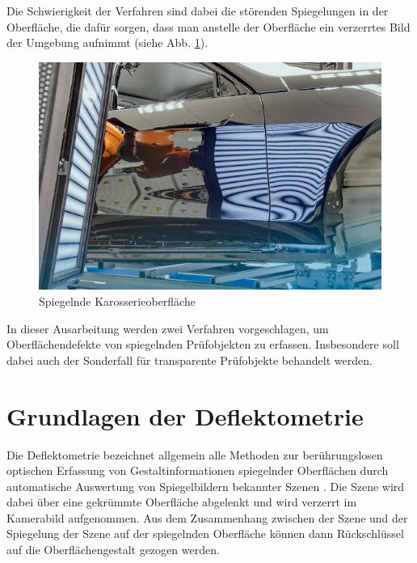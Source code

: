 \documentclass[ngerman,11pt,twocolumn,a4paper]{article}
\begin{document}
	\par
	Die Schwierigkeit der Verfahren sind dabei die störenden Spiegelungen in der Oberfläche, die dafür sorgen, dass man anstelle der Oberfläche ein verzerrtes Bild der Umgebung aufnimmt (siehe Abb. \ref{img:spiegelndeKarosserie}).
	\begin{figure}[H]
		\centering
		\includegraphics[width=0.75\columnwidth]{spiegelndeKarosserie}
		\caption{Spiegelnde Karosserieoberfläche \cite{spiegelndeKarosserieImg}}
		\label{img:spiegelndeKarosserie}
	\end{figure}	
	
	In dieser Ausarbeitung werden zwei Verfahren vorgeschlagen, um Oberflächendefekte von spiegelnden Prüfobjekten zu erfassen.
	Insbesondere soll dabei auch der Sonderfall für transparente Prüfobjekte behandelt werden.
	
	\section{Grundlagen der Deflektometrie} \label{sec:grundlagenDerDeflektometrie}
	Die Deflektometrie bezeichnet allgemein alle Methoden zur berührungslosen optischen Erfassung von Gestaltinformationen spiegelnder Oberflächen durch automatische Auswertung von Spiegelbildern bekannter Szenen \cite{fraunhofer}.
	Die Szene wird dabei über eine gekrümmte Oberfläche abgelenkt und wird verzerrt im Kamerabild aufgenommen.
	Aus dem Zusammenhang zwischen der Szene und der Spiegelung der Szene auf der spiegelnden Oberfläche können dann Rückschlüssel auf die Oberflächengestalt gezogen werden.
	
\end{document}
